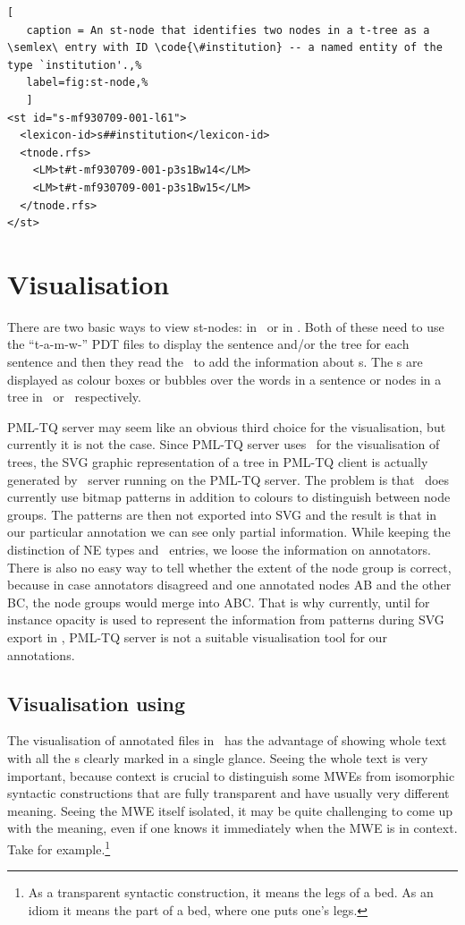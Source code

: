 \begin{lstlisting}[
   caption = An st-node that identifies two nodes in a t-tree as a \semlex\ entry with ID \code{\#institution} -- a named entity of the type `institution'.,%
   label=fig:st-node,%
   ]
<st id="s-mf930709-001-l61">
  <lexicon-id>s##institution</lexicon-id>
  <tnode.rfs>
    <LM>t#t-mf930709-001-p3s1Bw14</LM>
    <LM>t#t-mf930709-001-p3s1Bw15</LM>
  </tnode.rfs>
</st>
\end{lstlisting}

\section{Visualisation}
\label{sec:s:visual}
There are two basic ways to view st-nodes: in \seman\ or in \tred. Both of these need to use the ``t-a-m-w-'' PDT files to display the sentence and/or the tree for each sentence and then they read the \stf\ to add the information about \stn{}s. The \stn{}s are displayed as colour boxes or bubbles over the words in a sentence or nodes in a tree in \seman\ or \tred\ respectively.

PML-TQ server may seem like an obvious third choice for the visualisation, but currently it is not the case. Since PML-TQ server uses \tred\ for the visualisation of trees, the SVG graphic representation of a tree in PML-TQ client is actually generated by \btred\ server running on the PML-TQ server. The problem is that \tred\ does  currently use bitmap patterns in addition to colours to distinguish between node groups. The patterns are then not exported into SVG and the result is that in our particular annotation we can see only partial information. While keeping the distinction of NE types and \semlex\ entries, we loose the information on annotators. There is also no easy way to tell whether the extent of the node group is correct, because in case annotators disagreed and one annotated nodes AB and the other BC, the node groups would merge into ABC. That is why currently, until for instance opacity is used to represent the information from patterns during SVG export in \tred, PML-TQ server is not a suitable visualisation tool for our annotations. 


\subsection{Visualisation using \seman}
The visualisation of annotated files in \seman\ has the advantage of showing whole text with all the \mwe{}s clearly marked in a single glance. Seeing the whole text is very important, because context is crucial to distinguish some MWEs from isomorphic syntactic constructions that are fully transparent and have usually very different meaning. Seeing the MWE itself isolated, it may be quite challenging to come up with the meaning, even if one knows it immediately when the MWE is in context. Take  for example.\footnote{As a transparent syntactic construction, it means the legs of a bed. As an idiom it means the part of a bed, where one puts one's legs.} 

